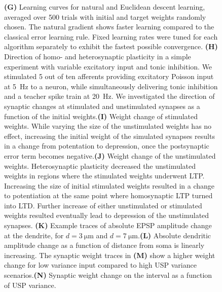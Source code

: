 \documentclass[12pt]{article}
\begin{document}
\begin{figure}
{{\bf(G)} Learning curves for natural and Euclidean descent learning, averaged over \num{500} trials with initial and target weights randomly chosen. The natural gradient shows faster learning compared to the classical error learning rule. Fixed learning rates were tuned for each algorithm separately to exhibit the fastest possible convergence.%
{\bf(H)} Direction of homo- and heterosynaptic plasticity in a simple experiment with variable excitatory input and tonic inhibition. We stimulated \num{5} out of ten afferents providing excitatory Poisson input at \SI{5}{\hertz} to a neuron, while simultaneously delivering tonic inhibition and a teacher spike train at \SI{20}{\hertz}. We investigated the direction of synaptic changes at stimulated and unstimulated synapses as a function of the initial weights.{\bf (I)} Weight change of stimulated weights. While varying the size of the unstimulated weights has no effect, increasing the initial weight of the simulated synapses results in a change from potentation to depression, once the postsynaptic error term becomes negative.{\bf (J)} Weight change of the unstimulated weights. Heterosynaptic plasticity decreased the unstimulated weights in regions where the stimulated weights underwent LTP. Increasing the size of initial stimulated weights resulted in a change to potentiation at the same point where homosynaptic LTP turned into LTD. Further increase of either unstimulated or stimulated weights resulted eventually lead to depression of the unstimulated synapses. {\bf(K)} Example traces of absolute EPSP amplitude change at the dendrite, for $d=\SI{3}{\micro\meter}$ and $d=\SI{7}{\micro\meter}$.{\bf(L)} Absolute dendritic amplitude change as a function of distance from soma is linearly increasing. The synaptic weight traces in {\bf(M)} show a higher weight change for low variance input compared to high USP variance scenarios.{\bf(N)} Synaptic weight change on the interval as a function of USP variance.}
\end{figure}
\end{document}
